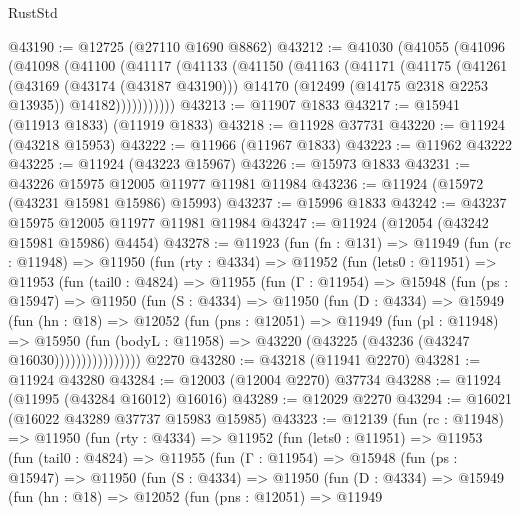 \begin{lexlean}{RustStd}
\begin{coremodule}
@43190 := @12725 (@27110 @1690 @8862)
@43212 := @41030
    (@41055
      (@41096
        (@41098
          (@41100
            (@41117
              (@41133
                (@41150
                  (@41163
                    (@41171
                      (@41175
                        (@41261
                          (@43169 (@43174 (@43187 @43190)))
                          @14170
                          (@12499 (@14175 @2318 @2253 @13935))
                          @14182)))))))))))
@43213 := @11907 @1833
@43217 := @15941 (@11913 @1833) (@11919 @1833)
@43218 := @11928 @37731
@43220 := @11924 (@43218 @15953)
@43222 := @11966 (@11967 @1833)
@43223 := @11962 @43222
@43225 := @11924 (@43223 @15967)
@43226 := @15973 @1833
@43231 := @43226 @15975 @12005 @11977 @11981 @11984
@43236 := @11924 (@15972 (@43231 @15981 @15986) @15993)
@43237 := @15996 @1833
@43242 := @43237 @15975 @12005 @11977 @11981 @11984
@43247 := @11924 (@12054 (@43242 @15981 @15986) @4454)
@43278 := @11923
    (fun (fn : @131) =>
    @11949
      (fun (rc : @11948) =>
      @11950
        (fun (rty : @4334) =>
        @11952
          (fun (lets0 : @11951) =>
          @11953
            (fun (tail0 : @4824) =>
            @11955
              (fun (Γ : @11954) =>
              @15948
                (fun (ps : @15947) =>
                @11950
                  (fun (S : @4334) =>
                  @11950
                    (fun (D : @4334) =>
                    @15949
                      (fun (hn : @18) =>
                      @12052
                        (fun (pns : @12051) =>
                        @11949
                          (fun (pl : @11948) =>
                          @15950
                            (fun (bodyL : @11958) =>
                            @43220 (@43225 (@43236 (@43247 @16030))))))))))))))))
    @2270
@43280 := @43218 (@11941 @2270)
@43281 := @11924 @43280
@43284 := @12003 (@12004 @2270) @37734
@43288 := @11924 (@11995 (@43284 @16012) @16016)
@43289 := @12029 @2270
@43294 := @16021 (@16022 @43289 @37737 @15983 @15985)
@43323 := @12139
    (fun (rc : @11948) =>
    @11950
      (fun (rty : @4334) =>
      @11952
        (fun (lets0 : @11951) =>
        @11953
          (fun (tail0 : @4824) =>
          @11955
            (fun (Γ : @11954) =>
            @15948
              (fun (ps : @15947) =>
              @11950
                (fun (S : @4334) =>
                @11950
                  (fun (D : @4334) =>
                  @15949
                    (fun (hn : @18) =>
                    @12052
                      (fun (pns : @12051) =>
                      @11949

\end{coremodule}
\end{lexlean}
